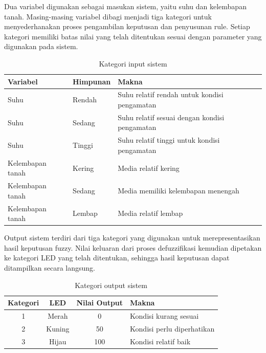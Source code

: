 \documentclass[12pt,a4paper]{article}
\begin{document}
Dua variabel digunakan sebagai masukan sistem, yaitu suhu dan kelembapan tanah. Masing-masing variabel dibagi menjadi tiga kategori untuk menyederhanakan proses pengambilan keputusan dan penyusunan rule. Setiap kategori memiliki batas nilai yang telah ditentukan sesuai dengan parameter yang digunakan pada sistem.

\begin{table}[H]
    \centering
    \caption{Kategori input sistem}
    \label{tab:kategoriinput}
    \begin{tabularx}{\textwidth}{p{} p{} X}
        \toprule
        \textbf{Variabel} & \textbf{Himpunan} & \textbf{Makna} \\
        \midrule
        Suhu & Rendah & Suhu relatif rendah untuk kondisi pengamatan \\
        Suhu & Sedang & Suhu relatif sesuai dengan kondisi pengamatan \\
        Suhu & Tinggi & Suhu relatif tinggi untuk kondisi pengamatan \\
        \midrule
        Kelembapan tanah & Kering & Media relatif kering \\
        Kelembapan tanah & Sedang & Media memiliki kelembapan menengah \\
        Kelembapan tanah & Lembap & Media relatif lembap \\
        \bottomrule
    \end{tabularx}
\end{table}

Output sistem terdiri dari tiga kategori yang digunakan untuk merepresentasikan hasil keputusan fuzzy. Nilai keluaran dari proses defuzzifikasi kemudian dipetakan ke kategori LED yang telah ditentukan, sehingga hasil keputusan dapat ditampilkan secara langsung.

\begin{table}[H]
    \centering
    \caption{Kategori output sistem}
    \label{tab:output}
    \begin{tabularx}{\textwidth}{c c c X}
        \toprule
        \textbf{Kategori} & \textbf{LED} & \textbf{Nilai Output} & \textbf{Makna} \\
        \midrule
        1 & Merah & 0 & Kondisi kurang sesuai \\
        2 & Kuning & 50 & Kondisi perlu diperhatikan \\
        3 & Hijau & 100 & Kondisi relatif baik \\
        \bottomrule
    \end{tabularx}
\end{table}
\end{document}
